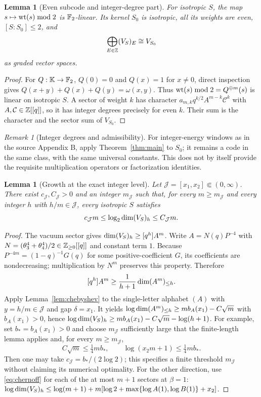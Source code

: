 \documentclass[10pt,a4paper]{article}
\numberwithin{equation}{section}
\newtheorem{lemma}[theorem]{Lemma}\newtheorem{proposition}[theorem]{Proposition}
\theoremstyle{remark}\newtheorem{remark}[theorem]{Remark}\newtheorem{question}[theorem]{Question}
\begin{document}
\begin{lemma}[Even subcode and integer-degree part]\label{lem:even}
For isotropic $S$, the map $s\mapsto\mathrm{wt}(s)\bmod2$ is $\mathbb F_2$-linear. Its kernel $S_0$ is isotropic, all its weights are even, $[S:S_0]\le2$, and
\[
\bigoplus_{E\in\mathbb Z}(V_S)_E\cong V_{S_0}
\]
as graded vector spaces.
\end{lemma}
\begin{proof}For $Q:\mathbb K\to\mathbb F_2$, $Q(0)=0$ and $Q(x)=1$ for $x\ne0$, direct inspection gives $Q(x+y)+Q(x)+Q(y)=\omega(x,y)$. Thus $\mathrm{wt}(s)\bmod2=Q^{\oplus m}(s)$ is linear on isotropic $S$. A sector of weight $k$ has character $a_{m,k}q^{k/2}A^{m-k}\mathcal C^k$ with $A,\mathcal C\in\mathbb Z[[q]]$, so it has integer degrees precisely for even $k$. Their sum is the character and the sector sum of $V_{S_0}$.\end{proof}
\begin{remark}[Integer degrees and admissibility]
For integer-energy windows as in the source Appendix B, apply Theorem~\ref{thm:main} to $S_0$; it remains a code in the same class, with the same universal constants. This does not by itself provide the requisite multiplication operators or factorization identities.\end{remark}

\begin{lemma}[Growth at the exact integer level]\label{lem:linear}
Let $\mathcal J=[x_1,x_2]\Subset(0,\infty)$. There exist $c_{\mathcal J},C_{\mathcal J}>0$ and an integer $m_{\mathcal J}$ such that, for every $m\ge m_{\mathcal J}$ and every \emph{integer $h$} with $h/m\in \mathcal J$, every isotropic $S$ satisfies
\begin{equation}\label{eq:linear}
c_{\mathcal J}m\le\log_2\operatorname{dim}(V_S)_h\le C_{\mathcal J}m.
\end{equation}
\end{lemma}
\begin{proof}
The vacuum sector gives $\operatorname{dim}(V_S)_h\ge[q^h]A^m$. Write $A=N(q)P^{-4}$ with $N=(\theta_3^4+\theta_4^4)/2\in\mathbb Z_{\ge0}[[q]]$ and constant term $1$. Because $P^{-4m}=(1-q)^{-1}G(q)$ for some positive-coefficient $G$, its coefficients are nondecreasing; multiplication by $N^m$ preserves this property. Therefore
\[
[q^h]A^m\ge\frac{1}{h+1}\operatorname{dim}(A^m)_{\le h}.
\]
Apply Lemma~\ref{lem:chebyshev} to the single-letter alphabet $(A)$ with $y=h/m\in \mathcal J$ and gap $\delta=x_1$. It yields $\log\operatorname{dim}(A^m)_{\le h}\ge m b_A(x_1)-C\sqrt m$ with $b_A(x_1)>0$, hence $\log\operatorname{dim}(V_S)_h\ge mb_A(x_1)-C\sqrt m-\log(h+1)$. For example, set $b_*=b_A(x_1)>0$ and choose $m_{\mathcal J}$ sufficiently large that the finite-length lemma applies and, for every $m\ge m_{\mathcal J}$,
\[
C\sqrt m\le\tfrac14mb_*,\qquad \log(x_2m+1)\le\tfrac14mb_*.
\]
Then one may take $c_{\mathcal J}=b_*/(2\log2)$; this specifies a finite threshold $m_{\mathcal J}$ without claiming its numerical optimality. For the other direction, use \eqref{eq:chernoff} for each of the at most $m+1$ sectors at $\beta=1$: $\log\operatorname{dim}(V_S)_h\le\log(m+1)+m[\log2+\max\{\log A(1),\log B(1)\}+x_2]$.\end{proof}
\end{document}
